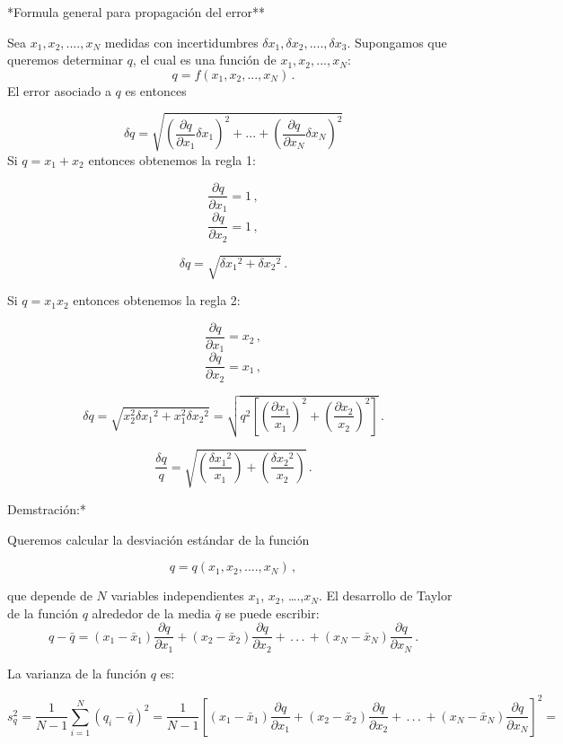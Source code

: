 \documentclass[
]{agujournal2019}
\begin{document}
\noindent **Formula general para propagación del error**

\noindent Sea \(x_1, x_2,....,x_N\) medidas con incertidumbres
\(\delta{x_1},\delta{x_2},....,\delta{x_3}\). Supongamos que queremos
determinar \(q\), el cual es una función de \(x_1,x_2,...,x_N\):
\[q=f(x_1, x_2,...,x_N)\,.\] El error asociado a \(q\) es entonces

\[\delta{q}=\sqrt{\left( \frac{\partial{q}}{\partial{x_1}}\delta{x_1}\right)^2 + ... +
                  \left( \frac{\partial{q}}{\partial{x_N}}\delta{x_N}\right)^2}\]
\noindent Si \(q=x_1+x_2\) entonces obtenemos la regla 1:

\[\frac{\partial{q}}{\partial{x_1}}=1\,,\]
\[\frac{\partial{q}}{\partial{x_2}}=1\,,\]

\[\delta{q}=\sqrt{\delta{x_1}^2 + \delta{x_2}^2}\,.\]

\noindent Si \(q=x_1x_2\) entonces obtenemos la regla 2:

\[\frac{\partial{q}}{\partial{x_1}}=x_2\,,\]
\[\frac{\partial{q}}{\partial{x_2}}=x_1\,,\]

\[\delta{q}=\sqrt{x^2_2\delta{x_1}^2 + x^2_1\delta{x_2}^2}=\sqrt{q^2\left[ \left(\frac{\partial{x_1}}{x_1}\right)^2 + \left(\frac{\partial{x_2}}{x_2}\right)^2\right]}\,.\]

\[\frac{\delta{q}}{q}=\sqrt{\left(\frac{\delta{x_1}^2}{x_1}\right) + \left(\frac{\delta{x_2}^2}{x_2}\right)}\,.\]

\vspace{0.5cm}

\noindent *Demstración:*

\noindent Queremos calcular la desviación estándar de la función

\[q=q(x_1, x_2,....,x_N)\,,\]

que depende de \(N\) variables independientes \(x_1\), \(x_2\),
\ldots.,\(x_N\). El desarrollo de Taylor de la función \(q\) alrededor
de la media \(\bar{q}\) se puede escribir:
\[q - \bar{q}=\left(x_1 - \bar{x}_1\right)\frac{\partial{q}}{\partial{x_1}} +
                          \left(x_2 - \bar{x}_2\right)\frac{\partial{q}}{\partial{x_2}}+  \,.\,.\,.\,
                          + \left(x_N - \bar{x}_N\right)\frac{\partial{q}}{\partial{x_N}}\,.\]

\noindent La varianza de la función \(q\) es:

\[s^2_q=\frac{1}{N-1}\sum\limits^N_{i=1}\left( q_i-\bar{q} \right)^2=
               \frac{1}{N-1}\left[
               \left(x_1 - \bar{x}_1\right)\frac{\partial{q}}{\partial{x_1}} +
               \left(x_2 - \bar{x}_2\right)\frac{\partial{q}}{\partial{x_2}} +
              \,.\,.\,.\, +
               \left(x_N - \bar{x}_N\right)\frac{\partial{q}}{\partial{x_N}}
               \right]^2=\]
\end{document}
